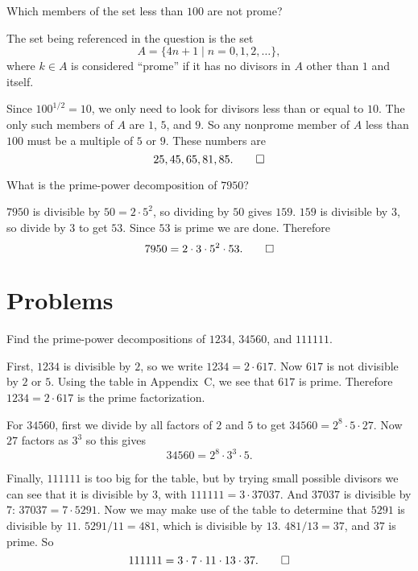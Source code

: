  Which members of the set less than $100$ are not prome?
\begin{solution}
  The set being referenced in the question is the set
  \begin{equation*}
    A = \{4n+1\mid n = 0, 1, 2, \dots\},
  \end{equation*}
  where $k\in A$ is considered ``prome'' if it has no divisors in $A$
  other than $1$ and itself.

  Since $100^{1/2} = 10$, we only need to look for divisors less than
  or equal to $10$. The only such members of $A$ are $1$, $5$, and
  $9$. So any nonprome member of $A$ less than $100$ must be a
  multiple of $5$ or $9$. These numbers are
  \begin{equation*}
    25, 45, 65, 81, 85. \qedhere
  \end{equation*}
\end{solution}

 What is the prime-power decomposition of $7950$?
\begin{solution}
  $7950$ is divisible by $50 = 2\cdot5^2$, so dividing by $50$ gives
  $159$. $159$ is divisible by $3$, so divide by $3$ to get
  $53$. Since $53$ is prime we are done. Therefore
  \begin{equation*}
    7950 = 2\cdot3\cdot5^2\cdot53. \qedhere
  \end{equation*}
\end{solution}

\section{Problems}

 Find the prime-power decompositions of $1234$, $34560$, and
$111111$.
\begin{solution}
  First, $1234$ is divisible by $2$, so we write $1234 =
  2\cdot617$. Now $617$ is not divisible by $2$ or $5$. Using the
  table in Appendix~C, we see that $617$ is prime. Therefore
  $1234 = 2\cdot617$ is the prime factorization.

  For $34560$, first we divide by all factors of $2$ and $5$ to get
  $34560 = 2^8\cdot5\cdot27$. Now $27$ factors as $3^3$ so this gives
  \begin{equation*}
    34560 = 2^8\cdot3^3\cdot5.
  \end{equation*}

  Finally, $111111$ is too big for the table, but by trying small
  possible divisors we can see that it is divisible by $3$, with
  $111111 = 3\cdot37037$. And $37037$ is divisible by $7$:
  $37037 = 7\cdot5291$. Now we may make use of the table to determine
  that $5291$ is divisible by $11$. $5291/11 = 481$, which is
  divisible by $13$. $481/13 = 37$, and $37$ is prime. So
  \begin{equation*}
    111111 = 3\cdot7\cdot11\cdot13\cdot37.\qedhere
  \end{equation*}
\end{solution}

